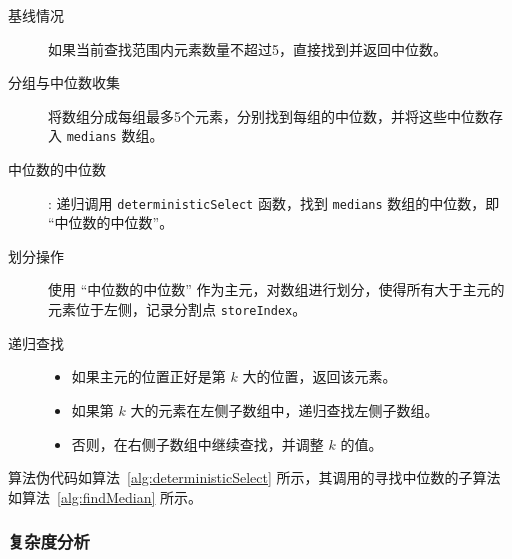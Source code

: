    \begin{description}
        \item[基线情况] 如果当前查找范围内元素数量不超过5，直接找到并返回中位数。
        \item[分组与中位数收集] 将数组分成每组最多5个元素，分别找到每组的中位数，并将这些中位数存入 \texttt{medians} 数组。
        \item[中位数的中位数]: 递归调用 \texttt{deterministicSelect} 函数，找到 \texttt{medians} 数组的中位数，即 ``中位数的中位数''。
        \item[划分操作] 使用 ``中位数的中位数'' 作为主元，对数组进行划分，使得所有大于主元的元素位于左侧，记录分割点 \texttt{storeIndex}。
        \item[递归查找] \begin{itemize}
            \item 如果主元的位置正好是第 $k$ 大的位置，返回该元素。
            \item 如果第 $k$ 大的元素在左侧子数组中，递归查找左侧子数组。
            \item 否则，在右侧子数组中继续查找，并调整 $k$ 的值。
        \end{itemize}
    \end{description}

    算法伪代码如算法~\autoref{alg:deterministicSelect} 所示，其调用的寻找中位数的子算法如算法~\autoref{alg:findMedian} 所示。
\subsubsection{复杂度分析}

